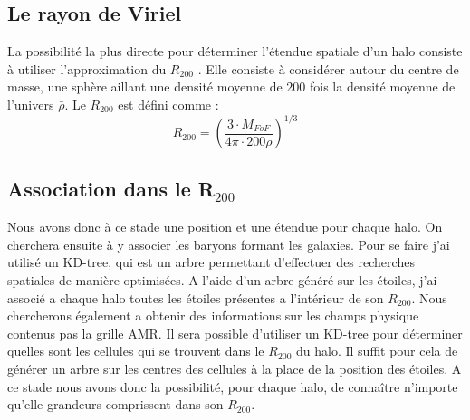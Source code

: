 \subsection{Le rayon de Viriel}
La possibilité la plus directe pour déterminer l'étendue spatiale d'un halo consiste à utiliser l'approximation du $R_{200}$ \citep{1997ApJ...490..493N}.
Elle consiste à considérer autour du centre de masse, une sphère aillant une densité moyenne de $200$ fois la densité moyenne de l'univers $\bar{\rho}$.
Le $R_{200}$ est défini comme : 
\begin{equation}
R_{200}= \left( \frac{3\cdot M_{FoF} }{4\pi\cdot 200 \bar{\rho}} \right)^{1/3}
\end{equation}


\subsection{Association dans le R$_{200}$}



%

Nous avons donc à ce stade une position et une étendue pour chaque halo.
On cherchera ensuite à y associer les baryons formant les galaxies.
Pour se faire j'ai utilisé un KD-tree, qui est un arbre permettant d'effectuer des recherches spatiales de manière optimisées.
A l'aide d'un arbre généré sur les étoiles, j'ai associé a chaque halo toutes les étoiles présentes a l'intérieur de son $R_{200}$.
Nous chercherons également a obtenir des informations sur les champs physique contenus pas la grille AMR.
Il sera possible d'utiliser un KD-tree pour déterminer quelles sont les cellules qui se trouvent dans le $R_{200}$ du halo.
Il suffit pour cela de générer un arbre sur les centres des cellules à la place de la position des étoiles.
A ce stade nous avons donc la possibilité, pour chaque halo, de connaître n'importe qu'elle grandeurs comprissent dans son $R_{200}$.

